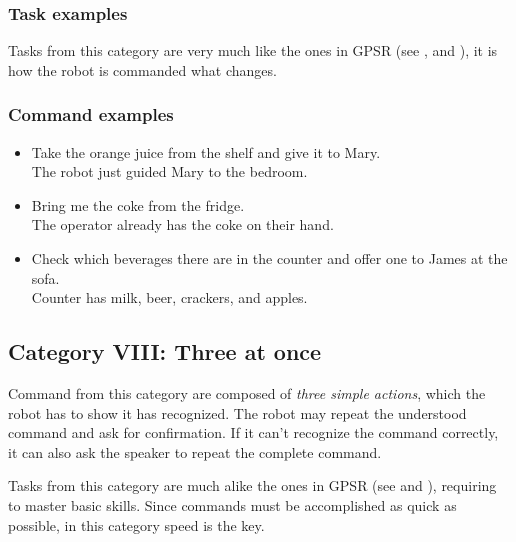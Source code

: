 \subsubsection{Task examples}
Tasks from this category are very much like the ones in GPSR (see ,  and ), it is how the robot is commanded what changes.

\subsubsection{Command examples}
\begin{itemize}
	\item Take the orange juice from the shelf and give it to Mary. \\
	The robot just guided Mary to the bedroom. \\

	\item Bring me the coke from the fridge. \\
	The operator already has the coke on their hand. \\

	\item Check which beverages there are in the counter and offer one to James at the sofa. \\
	Counter has milk, beer, crackers, and apples.
\end{itemize}



%
%
\subsection{Category VIII: Three at once}
\label{sec:eegpsr-category8-explained}
Command from this category are composed of \textit{three simple actions}, which the robot has to show it has recognized. The robot may repeat the understood command and ask for confirmation. If it can't recognize the command correctly, it can also ask the speaker to repeat the complete command.

Tasks from this category are much alike the ones in GPSR (see  and ), requiring to master basic skills. Since commands must be accomplished as quick as possible, in this category speed is the key.

